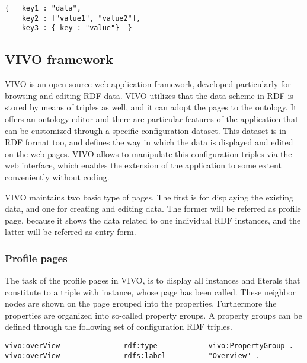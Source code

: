 \begin{lstlisting}[captionpos=b, caption=JSON object example, label=jsListing, belowskip=1em, aboveskip=2em,
basicstyle=\footnotesize,frame=single]
{	key1 : "data",
	key2 : ["value1", "value2"],
	key3 : { key : "value"}  }
\end{lstlisting}


\subsection{VIVO framework} \label{vivo}


VIVO is an open source web application framework, developed particularly for browsing and editing RDF data. VIVO utilizes that the data scheme in RDF is stored by means of triples as well, and it can adopt the pages to the ontology. It offers an ontology editor and there are particular features of the application that can be customized through a specific configuration dataset. This dataset is in RDF format too, and defines the way in which the data is displayed and edited on the web pages. VIVO allows to manipulate this configuration triples via the web interface, which enables the extension of the application to some extent conveniently without coding.

VIVO maintains two basic type of pages. The first is for displaying the existing data, and one for creating and editing data. The former will be referred as profile page, because it shows the data related to one individual RDF instances, and the latter will be referred as entry form. 


\subsubsection{Profile pages} \label{vivoPp}

The task of the profile pages in VIVO, is to display all instances and literals that constitute to a triple with instance, whose page has been called. These neighbor nodes are shown on the page grouped into the properties. Furthermore the properties are organized into so-called property groups.  A property groups can be defined through the following set of configuration RDF triples. 

\begin{lstlisting}[captionpos=b, caption=Property group definition, label=jsListing, belowskip=1em, aboveskip=2em,
basicstyle=\footnotesize,frame=single]
vivo:overView				rdf:type			vivo:PropertyGroup .
vivo:overView				rdfs:label			"Overview" .
\end{lstlisting}

